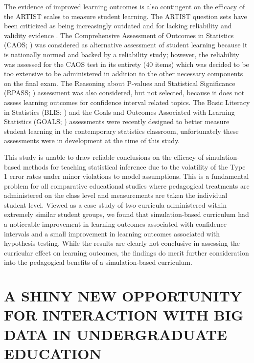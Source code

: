 \documentclass[11pt]{isuthesis}\usepackage[]{graphicx}\usepackage[]{color}
\newcommand{\km}[1]{{\color{red} #1}}
\newcommand\chaptocbreak{
	\addtocontents{toc}{\protect\needspace{4\baselineskip}}
	\addtocontents{lof}{\protect\needspace{2\baselineskip}}
	\addtocontents{lot}{\protect\needspace{2\baselineskip}}
}
\begin{document}
The evidence of improved learning outcomes is also contingent on the efficacy of the ARTIST scales to measure student learning. The ARTIST question sets have been criticized as being increasingly outdated and for lacking reliability and validity evidence \citep{Ziegler2014}. The Comprehensive Assessment of Outcomes in Statistics (CAOS; \citealt{DelMas2007}) was considered as alternative assessment of student learning because it is nationally normed and backed by a reliability study; however, the reliability was assessed for the CAOS test in its entirety (40 items) which was decided to be too extensive to be administered in addition to the other necessary components on the final exam. The Reasoning about P-values and Statistical Significance (RPASS; \citealt{LaneGetaz2013}) assessment was also considered, but not selected, because it does not assess learning outcomes for confidence interval related topics. The Basic Literacy in Statistics (BLIS; \citealt{Ziegler2014}) and the Goals and Outcomes Associated with Learning Statistics (GOALS; \citealt{Garfield2012}) assessments were recently designed to better measure student learning in the contemporary statistics classroom, unfortunately these assessments were in development at the time of this study.

\km{ This study is unable to draw reliable conclusions on the efficacy of simulation-based methods for teaching statistical inference due to the volatility of the Type 1 error rates under minor violations to model assumptions. This is a fundamental problem for all comparative educational studies where pedagogical treatments are administered on the class level and measurements are taken the individual student level. Viewed as a case study of two curricula administered within extremely similar student groups, we found that simulation-based curriculum had a noticeable improvement in learning outcomes associated with confidence intervals and a small improvement in learning outcomes associated with hypothesis testing. While the results are clearly not conclusive in assessing the curricular effect on learning outcomes, the findings do merit further consideration into the pedagogical benefits of a simulation-based curriculum. }
\chaptocbreak

\chapter{A SHINY NEW OPPORTUNITY FOR INTERACTION WITH BIG DATA IN UNDERGRADUATE EDUCATION}\label{ShinyDBSampler}
\end{document}
